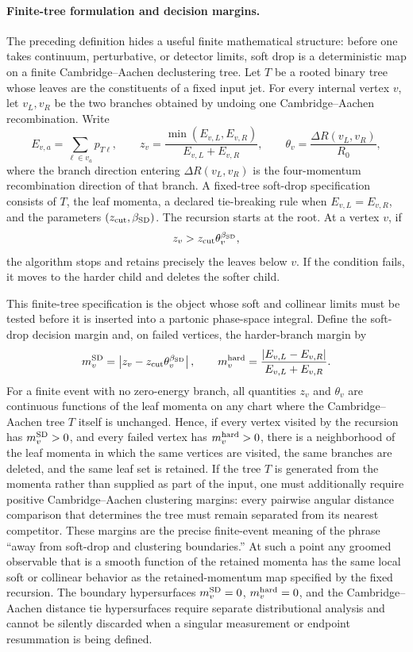 \paragraph{Finite-tree formulation and decision margins.}
The preceding definition hides a useful finite mathematical structure: before one takes
continuum, perturbative, or detector limits, soft drop is a deterministic map
on a finite Cambridge--Aachen declustering tree.  Let \(T\) be a rooted binary
tree whose leaves are the constituents of a fixed input jet.  For every
internal vertex \(v\), let \(v_L,v_R\) be the two branches obtained by undoing
one Cambridge--Aachen recombination.  Write
\[
  E_{v,a}=\sum_{\ell\in v_a}p_{T\ell},
  \qquad
  z_v=\frac{\min(E_{v,L},E_{v,R})}{E_{v,L}+E_{v,R}},
  \qquad
  \theta_v=\frac{\Delta R(v_L,v_R)}{R_0},
\]
where the branch direction entering \(\Delta R(v_L,v_R)\) is the
four-momentum recombination direction of that branch.  A fixed-tree soft-drop
specification consists of \(T\), the leaf momenta, a declared tie-breaking rule when
\(E_{v,L}=E_{v,R}\), and the parameters \((z_{\rm cut},\beta_{\rm SD})\).
The recursion starts at the root.  At a vertex \(v\), if
\[
  z_v>z_{\rm cut}\theta_v^{\beta_{\rm SD}},
\]
the algorithm stops and retains precisely the leaves below \(v\).  If the
condition fails, it moves to the harder child and deletes the softer child.

This finite-tree specification is the object whose soft and collinear limits must be
tested before it is inserted into a partonic phase-space integral.  Define the
soft-drop decision margin and, on failed vertices, the harder-branch margin by
\begin{equation}
  m_v^{\rm SD}
  =
  \left|z_v-z_{\rm cut}\theta_v^{\beta_{\rm SD}}\right|,
  \qquad
  m_v^{\rm hard}
  =
  \frac{|E_{v,L}-E_{v,R}|}{E_{v,L}+E_{v,R}} .
  \label{eq:soft-drop-decision-margins}
\end{equation}
For a finite event with no zero-energy branch, all quantities \(z_v\) and
\(\theta_v\) are continuous functions of the leaf momenta on any chart where
the Cambridge--Aachen tree \(T\) itself is unchanged.  Hence, if every vertex
visited by the recursion has \(m_v^{\rm SD}>0\), and every failed vertex has
\(m_v^{\rm hard}>0\), there is a neighborhood of the leaf momenta in which
the same vertices are visited, the same branches are deleted, and the same
leaf set is retained.  If the tree \(T\) is generated from the momenta rather
than supplied as part of the input, one must additionally require positive
Cambridge--Aachen clustering margins: every pairwise angular distance
comparison that determines the tree must remain separated from its nearest
competitor.  These margins are the precise finite-event meaning of the phrase
``away from soft-drop and clustering boundaries.''  At such a point any
groomed observable that is a smooth function of the retained momenta has the
same local soft or collinear behavior as the retained-momentum map specified
by the fixed recursion.  The boundary hypersurfaces
\(m_v^{\rm SD}=0\), \(m_v^{\rm hard}=0\), and the Cambridge--Aachen distance
tie hypersurfaces require separate distributional analysis and cannot be
silently discarded when a singular measurement or endpoint resummation is
being defined.

